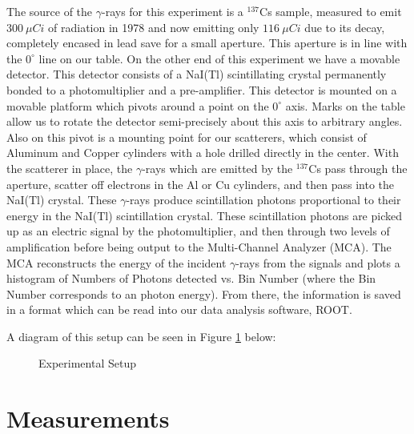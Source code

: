 \documentclass[%
 reprint,
 amsmath,amssymb,
 aps,
 pra,
]{revtex4-1}
\begin{document}
The source of the $\gamma$-rays for this experiment is a $^{137}$Cs sample, measured to emit $300~\mu Ci$ of radiation in 1978 and now emitting only $116~\mu Ci$ due to its decay, completely encased in lead save for a small aperture. This aperture is in line with the $0^\circ$ line on our table. On the other end of this experiment we have a movable detector. This detector consists of a NaI(Tl) scintillating crystal permanently bonded to a photomultiplier and a pre-amplifier. This detector is mounted on a movable platform which pivots around a point on the $0^\circ$ axis. Marks on the table allow us to rotate the detector semi-precisely about this axis to arbitrary angles. Also on this pivot is a mounting point for our scatterers, which consist of Aluminum and Copper cylinders with a hole drilled directly in the center. With the scatterer in place, the $\gamma$-rays which are emitted by the $^{137}$Cs pass through the aperture, scatter off electrons in the Al or Cu cylinders, and then pass into the NaI(Tl) crystal. These $\gamma$-rays produce scintillation photons proportional to their energy in the NaI(Tl) scintillation crystal. These scintillation photons are picked up as an electric signal by the photomultiplier, and then through two levels of amplification before being output to the Multi-Channel Analyzer (MCA). The MCA reconstructs the energy of the incident $\gamma$-rays from the signals and plots a histogram of Numbers of Photons detected vs. Bin Number (where the Bin Number corresponds to an photon energy). From there, the information is saved in a format which can be read into our data analysis software, ROOT.

A diagram of this setup can be seen in Figure \ref{Setup} below:
\begin{figure}[H]
	\centering
	\caption{Experimental Setup}
	\label{Setup}
\end{figure}

\section{Measurements}
\end{document}
